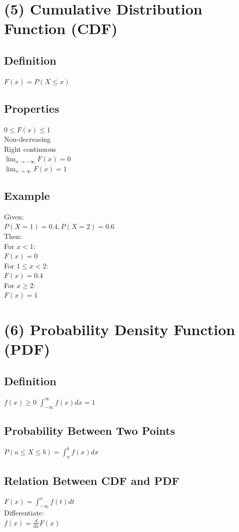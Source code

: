 \documentclass{article}
\begin{document}
\section{(5) Cumulative Distribution Function (CDF)}

\subsection{Definition}
$F(x)=P(X\le x)$

\subsection{Properties}
$0\le F(x)\le 1$ \\
Non-decreasing \\
Right continuous \\
$\lim_{x\to-\infty}F(x)=0$ \\
$\lim_{x\to\infty}F(x)=1$

\subsection{Example}
Given: \\
$P(X=1)=0.4, P(X=2)=0.6$ \\
Then: \\
For $x<1$: \\
$F(x)=0$ \\
For $1\le x<2$: \\
$F(x)=0.4$ \\
For $x\ge 2$: \\
$F(x)=1$

\section{(6) Probability Density Function (PDF)}

\subsection{Definition}
$f(x)\ge 0$ \quad $\int_{-\infty}^{\infty} f(x)dx=1$

\subsection{Probability Between Two Points}
$P(a\le X\le b)=\int_a^b f(x)dx$

\subsection{Relation Between CDF and PDF}
$F(x)=\int_{-\infty}^x f(t)dt$ \\
Differentiate: \\
$f(x)=\frac{d}{dx}F(x)$
\end{document}
